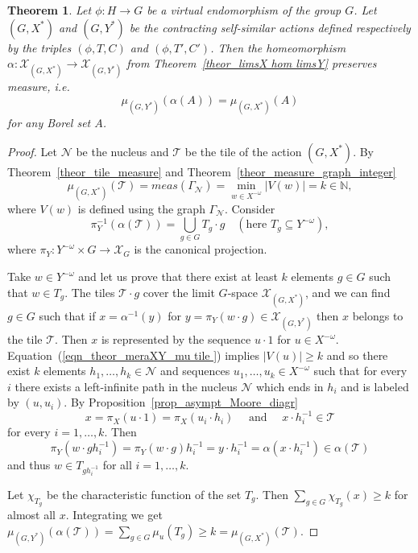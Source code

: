 \documentclass[12pt]{article}
\newcommand{\xmo}{X^{-\omega}}
\newcommand{\limGs}[1][G]{\mathcal{X}_{#1}}
\newcommand{\mgr}{meas}
\newcommand{\tile}{\mathscr{T}}
\newcommand{\nucl}{\mathcal{N}}
\newcommand{\gr}{\Gamma}
\newtheorem{theor}{Theorem}
\theoremstyle{definition}
\begin{document}
\begin{theor}\label{theor_measure_limGs_invariant}
Let $\phi: H\rightarrow G$ be a virtual endomorphism of the group $G$. Let $(G,X^*)$ and $(G,Y^*)$
be the contracting self-similar actions defined respectively by the triples $(\phi,T,C)$ and
$(\phi,T',C')$. Then the homeomorphism $\alpha : \limGs[(G,X^*)]\longrightarrow \limGs[(G,Y^*)]$
from Theorem~\ref{theor_limsX hom limsY} preserves measure, i.e.
\[
\mu_{(G,Y^*)}(\alpha(A))=\mu_{(G,X^*)}(A)
\]
for any Borel set $A$.
\end{theor}
\begin{proof}
Let $\nucl$ be the nucleus and $\tile$ be the tile of the action $(G,X^{*})$. By
Theorem~\ref{theor_tile_measure} and Theorem~\ref{theor_measure_graph_integer}
\begin{equation}\label{eqn_theor_meraXY_mu tile }
\mu_{(G,X^*)}(\tile)=\mgr(\gr_\nucl)=\min_{w\in\xmo} |V(w)|=k\in\mathbb{N},
\end{equation}
where $V(w)$ is defined using the graph $\gr_\nucl$. Consider
\[
\pi_Y^{-1}(\alpha(\tile))=\bigcup_{g\in G} T_g\cdot g\quad (\mbox{here } T_g\subseteq Y^{-\omega}),
\]
where $\pi_Y:Y^{-\omega}\times G\rightarrow \limGs$ is the canonical projection.

Take $w\in Y^{-\omega}$ and let us prove that there exist at least $k$ elements $g\in G$ such that
$w\in T_g$. The tiles $\tile\cdot g$ cover the limit $G$-space $\limGs[(G,X^*)]$, and we can find
$g\in G$ such that if $x=\alpha^{-1}(y)$ for $y=\pi_{Y}(w\cdot g)\in\limGs[(G,Y^*)]$ then $x$
belongs to the tile $\tile$. Then $x$ is represented by the sequence $u\cdot 1$ for $u\in\xmo$.
Equation~(\ref{eqn_theor_meraXY_mu tile }) implies $|V(u)|\geq k$ and so there exist $k$ elements
$h_1,\ldots, h_k\in\nucl$ and sequences $u_1,\ldots,u_k\in\xmo$ such that for every $i$ there
exists a left-infinite path in the nucleus $\nucl$ which ends in $h_i$ and is labeled by $(u,u_i)$.
By Proposition~\ref{prop_asympt_Moore_diagr}
\[
x=\pi_X(u\cdot 1)=\pi_X(u_i\cdot h_i)\quad\mbox{ and }\quad x\cdot h_i^{-1}\in\tile
\]
for every $i=1,\ldots, k$. Then
\[
\pi_Y(w\cdot gh_i^{-1})=\pi_Y(w\cdot g)h_i^{-1}=y\cdot h_i^{-1}=\alpha(x\cdot
h_i^{-1})\in\alpha(\tile)
\]
and thus $w\in T_{gh_i^{-1}}$ for all $i=1,\ldots, k$.

Let $\chi_{T_g}$ be the characteristic function of the set $T_g$. Then $\sum_{g\in
G}\chi_{T_g}(x)\geq k$ for almost all $x$. Integrating we get
$\mu_{(G,Y^*)}(\alpha(\tile))=\sum_{g\in G} \mu_u(T_g)\geq k=\mu_{(G,X^*)}(\tile)$.


\end{proof}
\end{document}
